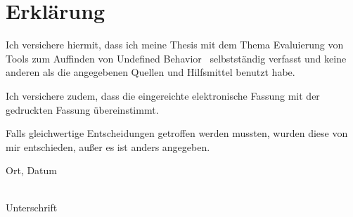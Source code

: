 \chapter*{Erklärung}
\label{ch:erklaerung}

Ich versichere hiermit, dass ich meine Thesis mit dem Thema
\glqq Evaluierung von Tools zum Auffinden von Undefined Behavior \grqq
\ selbstständig verfasst und keine anderen als die angegebenen Quellen und Hilfsmittel benutzt habe.

Ich versichere zudem, dass die eingereichte elektronische Fassung mit der gedruckten Fassung übereinstimmt.

Falls gleichwertige Entscheidungen getroffen werden mussten, wurden diese von mir
entschieden, außer es ist anders angegeben.

\vspace{1.5cm}
Ort, Datum

\vspace{0.5cm}
\underline{\hspace{10cm}}\\
Unterschrift